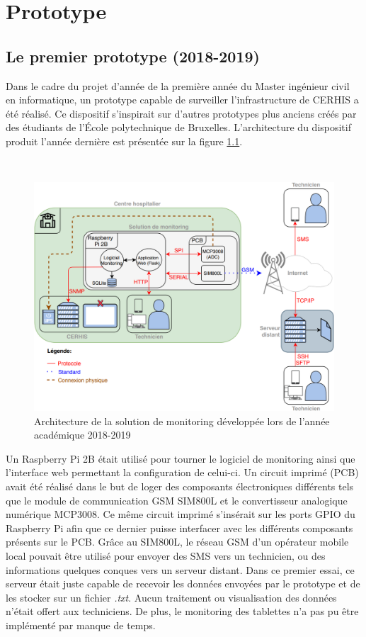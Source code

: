 \chapter{Prototype}

\section{Le premier prototype (2018-2019)}

\noindent
Dans le cadre du projet d'année de la première année du Master ingénieur civil en informatique, un prototype capable de surveiller l'infrastructure de CERHIS a été réalisé. Ce dispositif s'inspirait sur d'autres prototypes plus anciens créés par des étudiants de l'École polytechnique de Bruxelles. L'architecture du dispositif produit l'année dernière est présentée sur la figure \ref{fig:archi_prev}.

~

\begin{figure}[ht!]
  \includegraphics[width=\textwidth]{img/el_prototype/archi_prev.png}
  \caption{Architecture de la solution de monitoring développée lors de l'année académique 2018-2019}
  \label{fig:archi_prev}
\end{figure}



\noindent
Un Raspberry Pi 2B était utilisé pour tourner le logiciel de monitoring ainsi que l'interface web permettant la configuration de celui-ci. Un circuit imprimé (PCB) avait été réalisé dans le but de loger des composants électroniques différents tels que le module de communication GSM SIM800L et le convertisseur analogique numérique MCP3008. Ce même circuit imprimé s'insérait sur les ports GPIO du Raspberry Pi afin que ce dernier puisse interfacer avec les différents composants présents sur le PCB. Grâce au SIM800L, le réseau GSM d'un opérateur mobile local pouvait être utilisé pour envoyer des SMS vers un technicien, ou des informations quelques conques vers un serveur distant.  Dans ce premier essai, ce serveur était juste capable de recevoir les données envoyées par le prototype et de les stocker sur un fichier \textit{.txt}. Aucun traitement ou visualisation des données n'était offert aux techniciens. De plus, le monitoring des tablettes n'a pas pu être implémenté par manque de temps.

